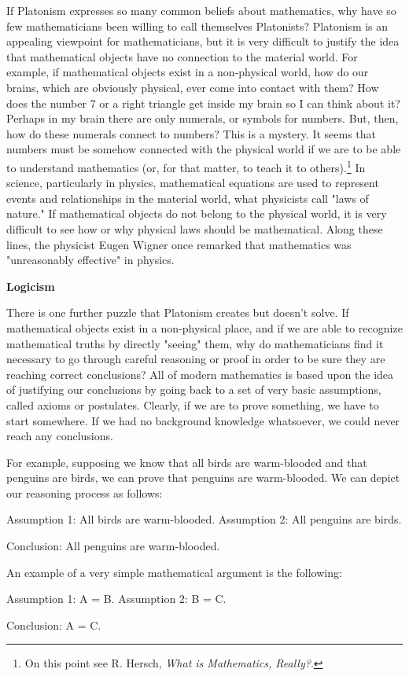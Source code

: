     If Platonism expresses so many common beliefs about mathematics, why have so few mathematicians been willing to call themselves Platonists?  Platonism is an appealing viewpoint for mathematicians, but it is very difficult to justify the idea that mathematical objects have no connection to the material world.  For example, if mathematical objects exist in a non-physical world, how do our brains, which are obviously physical, ever come into contact with them?  How does the number 7 or a right triangle get inside my brain so I can think about it?   Perhaps in my brain there are only numerals, or symbols for numbers.  But, then, how do these numerals connect to numbers?  This is a mystery.  It seems that numbers must be somehow connected with the physical world if we are to be able to understand mathematics (or, for that matter, to teach it to others).\footnote{On this point see R. Hersch, \textit{What is Mathematics, Really?}.}  In science, particularly in physics, mathematical equations are used to represent events and relationships in the material world, what physicists call "laws of nature."  If mathematical objects do not belong to the physical world, it is very difficult to see how or why physical laws should be mathematical.  Along these lines, the physicist Eugen Wigner once remarked that mathematics was "unreasonably effective" in physics.  

\noindent
\textbf{Logicism}

     There is one further puzzle that Platonism creates but doesn't solve.  If mathematical objects exist in a non-physical place, and if we are able to recognize mathematical truths by directly "seeing" them, why do mathematicians find it necessary to go through careful reasoning or proof  in order to be sure they are reaching correct conclusions?  All of modern mathematics is based upon the idea of  justifying our conclusions by going back to a set of very basic assumptions, called axioms or postulates.  Clearly, if we are to prove something, we have to start somewhere.  If we had no background knowledge whatsoever, we could never reach any conclusions.
     
     For example, supposing we know that all birds are warm-blooded and that  penguins are birds, we can prove that penguins are warm-blooded.  We can depict our reasoning process as follows:

\begin{center}
Assumption 1: All birds are warm-blooded. Assumption 2: All penguins are birds.

Conclusion: All penguins are warm-blooded.
\end{center}  
An example of a very simple mathematical argument is the following:
\begin{center}
Assumption 1: A = B. Assumption 2: B = C.

Conclusion: A = C.
\end{center}

